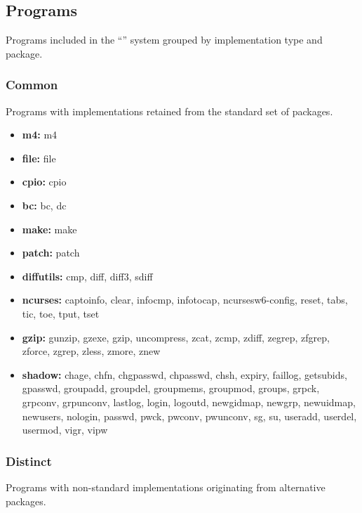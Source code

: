 \subsection{Programs}\label{Programs}

Programs included in the \enquote{} system grouped by implementation type and package.

\subsubsection{Common}

Programs with implementations retained from the standard set of packages.

\begin{itemize}
    \item \textbf{m4:} m4
    \item \textbf{file:} file
    \item \textbf{cpio:} cpio
    \item \textbf{bc:} bc, dc
    \item \textbf{make:} make
    \item \textbf{patch:} patch
    \item \textbf{diffutils:} cmp, diff, diff3, sdiff
    \item \textbf{ncurses:} captoinfo, clear, infocmp, infotocap, ncursesw6-config, reset, tabs, tic, toe, tput, tset
    \item \textbf{gzip:} gunzip, gzexe, gzip, uncompress, zcat, zcmp, zdiff, zegrep, zfgrep, zforce, zgrep, zless, zmore, znew
    \item \textbf{shadow:} chage, chfn, chgpasswd, chpasswd, chsh, expiry, faillog, getsubids, gpasswd, groupadd, groupdel, groupmems, groupmod, groups, grpck, grpconv, grpunconv, lastlog, login, logoutd, newgidmap, newgrp, newuidmap, newusers, nologin, passwd, pwck, pwconv, pwunconv, sg, su, useradd, userdel, usermod, vigr, vipw
\end{itemize}

\subsubsection{Distinct}

Programs with non-standard implementations originating from alternative packages.

